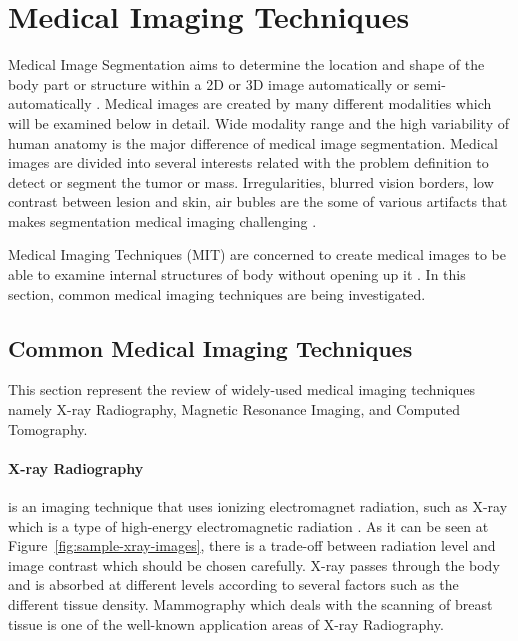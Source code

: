 \section{Medical Imaging Techniques}

    Medical Image Segmentation aims to determine the location and shape of the body part or structure within a 2D or 3D image automatically or semi-automatically \cite{merjulah2019classification}.
    Medical images are created by many different modalities which will be examined below in detail.
    Wide modality range and the high variability of human anatomy is the major difference of medical image segmentation.
    Medical images are divided into several interests related with the problem definition to detect or segment the tumor or mass.
    Irregularities, blurred vision borders, low contrast between lesion and skin, air bubles are the some of various artifacts that makes segmentation medical imaging challenging \cite{guo2019neutrosophic}.

    Medical Imaging Techniques (MIT) are concerned to create medical images to be able to examine internal structures of body without opening up it \cite{kasban2015comparative}.
    In this section, common medical imaging techniques are being investigated.

    \subsection{Common Medical Imaging Techniques}

        

        This section represent the review of widely-used medical imaging techniques namely X-ray Radiography, Magnetic Resonance Imaging, and Computed Tomography.

        \paragraph{X-ray Radiography} is an imaging technique that uses ionizing electromagnet radiation, such as X-ray which is a type of high-energy electromagnetic radiation \cite{kasban2015comparative}.
            As it can be seen at Figure~\ref{fig:sample-xray-images}, there is a trade-off between radiation level and image contrast which should be chosen carefully.
            X-ray passes through the body and is absorbed at different levels according to several factors such as the different tissue density.
            Mammography which deals with the scanning of breast tissue is one of the well-known application areas of X-ray Radiography.

